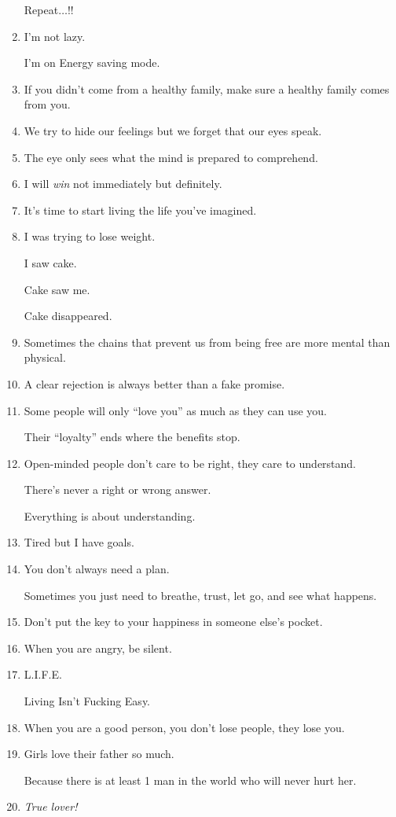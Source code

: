 \documentclass{article}
\begin{document}
\begin{enumerate}
	Repeat$\ldots$!!
	\item I'm not lazy.
	
	I'm on Energy saving mode.
	\item If you didn't come from a healthy family, make sure a healthy family comes from you.
	\item We try to hide our feelings but we forget that our eyes speak.
	\item The eye only sees what the mind is prepared to comprehend.
	\item I will \textit{win} not immediately but definitely.
	\item It's time to start living the life you've imagined.
	\item I was trying to lose weight.
	
	I saw cake.
	
	Cake saw me.
	
	Cake disappeared.
	\item Sometimes the chains that prevent us from being free are more mental than physical.
	\item A clear rejection is always better than a fake promise.
	\item Some people will only ``love you'' as much as they can use you.
	
	Their ``loyalty'' ends where the benefits stop.
	\item Open-minded people don't care to be right, they care to understand.
	
	There's never a right or wrong answer.
	
	Everything is about understanding.
	\item Tired but I have goals.
	\item You don't always need a plan.
	
	Sometimes you just need to breathe, trust, let go, and see what happens.
	\item Don't put the key to your happiness in someone else's pocket.
	\item When you are angry, be silent.
	\item L.I.F.E.
	
	Living Isn't Fucking Easy.
	\item When you are a good person, you don't lose people, they lose you.
	\item Girls love their father so much.
	
	Because there is at least 1 man in the world who will never hurt her.
	\item \textit{True lover!}
	

\end{enumerate}
\end{document}

